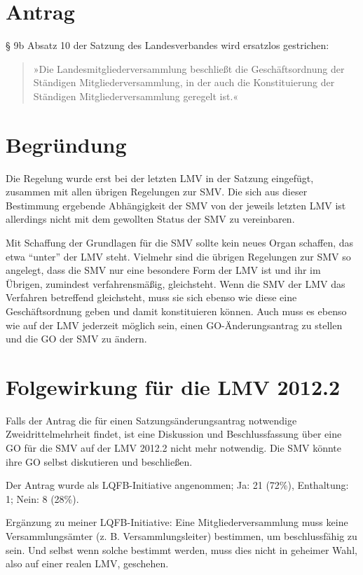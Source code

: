 \section{Antrag}

§ 9b Absatz 10 der Satzung des Landesverbandes wird ersatzlos gestrichen:

\begin{quote}
»Die Landesmitgliederversammlung beschließt die Geschäftsordnung der Ständigen Mitgliederversammlung, in der auch die Konstituierung der Ständigen Mitgliederversammlung geregelt ist.«

\end{quote}
\section{Begründung}

Die Regelung wurde erst bei der letzten LMV in der Satzung eingefügt, zusammen mit allen übrigen Regelungen zur SMV. Die sich aus dieser Bestimmung ergebende Abhängigkeit der SMV von der jeweils letzten LMV ist allerdings nicht mit dem gewollten Status der SMV zu vereinbaren.

Mit Schaffung der Grundlagen für die SMV sollte kein neues Organ schaffen, das etwa ``unter'' der LMV steht. Vielmehr sind die übrigen Regelungen zur SMV so angelegt, dass die SMV nur eine besondere Form der LMV ist und ihr im Übrigen, zumindest verfahrensmäßig, gleichsteht. Wenn die SMV der LMV das Verfahren betreffend gleichsteht, muss sie sich ebenso wie diese eine Geschäftsordnung geben und damit konstituieren können. Auch muss es ebenso wie auf der LMV jederzeit möglich sein, einen GO-Änderungsantrag zu stellen und die GO der SMV zu ändern.

\section{Folgewirkung für die LMV 2012.2}

Falls der Antrag die für einen Satzungsänderungsantrag notwendige Zweidrittelmehrheit findet, ist eine Diskussion und Beschlussfassung über eine GO für die SMV auf der LMV 2012.2 nicht mehr notwendig. Die SMV könnte ihre GO selbst diskutieren und beschließen.

Der Antrag wurde als LQFB-Initiative angenommen; Ja: 21 (72\%), Enthaltung: 1; Nein: 8 (28\%).

Ergänzung zu meiner LQFB-Initiative: Eine Mitgliederversammlung muss keine Versammlungsämter (z. B. Versammlungsleiter) bestimmen, um beschlussfähig zu sein. Und selbst wenn solche bestimmt werden, muss dies nicht in geheimer Wahl, also auf einer realen LMV, geschehen.

